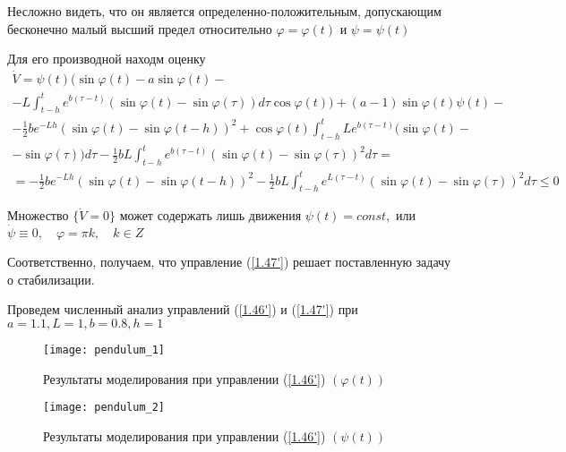 Несложно видеть, что он является определенно-положительным, допускающим бесконечно малый высший предел относительно $\varphi = \varphi (t)$ и $\psi = \psi (t)$

Для его производной находм оценку
$$
\begin{array}{c}
\displaystyle \dot V = \psi (t) (\sin \varphi (t) - a \sin \varphi (t) -\\
\displaystyle - L \int_{t-h}^{t} e^{b (\tau - t)} (\sin \varphi (t) - \sin \varphi (\tau)) d \tau \cos \varphi (t)) + (a - 1) \sin \varphi (t) \psi (t)-\\
\displaystyle - \frac12 b e^{- L h} (\sin \varphi (t) - \sin \varphi (t - h))^2 + \cos \varphi (t) \int_{t-h}^{t} L e^{b (\tau - t)} (\sin \varphi (t)-\\
\displaystyle - \sin \varphi (\tau)) d \tau - \frac12 b L \int_{t-h}^{t} e^{b (\tau - t)} (\sin \varphi (t) - \sin \varphi (\tau))^2 d \tau =\\
\displaystyle = - \frac12 b e^{- L h} (\sin \varphi (t) - \sin \varphi (t - h))^2 - \frac12 b L \int_{t-h}^{t} e^{L (\tau - t)} (\sin \varphi (t) - \sin \varphi (\tau))^2 d \tau \le 0
\end{array}
$$

Множество $\{ \dot V = 0 \}$ может содержать лишь движения $\psi (t) = const,$ или $\dot \psi \equiv 0, \quad \varphi = \pi k, \quad k \in Z$

Соответственно, получаем, что управление (\ref{1.47'}) решает поставленную задачу о стабилизации.

Проведем численный анализ управлений (\ref{1.46'}) и (\ref{1.47'}) при $a = 1.1, L = 1, b = 0.8, h = 1$

\begin{figure}[h]
	\centering
	\texttt{[image: pendulum\_1]}
	\caption{Результаты моделирования при управлении (\ref{1.46'}) $(\varphi (t))$}
	\label{fig:pendulum_1}
\end{figure}

\begin{figure}[h]
	\centering
	\texttt{[image: pendulum\_2]}
	\caption{Результаты моделирования при управлении (\ref{1.46'}) $(\psi (t))$}
	\label{fig:pendulum_2}
\end{figure}